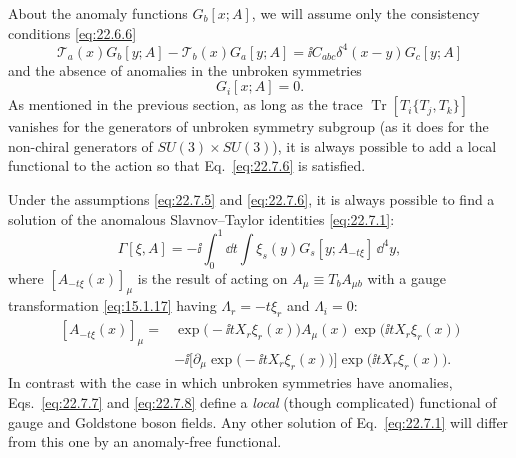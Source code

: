 About the anomaly functions $G_b[x;A]$, we will assume only the
consistency conditions \eqref{eq:22.6.6}
\begin{equation}
 \mathcal T_a(x)G_b[y;A]
 -\mathcal T_b(x)G_a[y;A]
 =\ii C_{abc}\delta^4(x-y)G_c[y;A]
 \tag{22.7.5}\label{eq:22.7.5}
\end{equation}
and the absence of anomalies in the unbroken symmetries
\begin{equation}
 G_i[x;A]=0.
 \tag{22.7.6}\label{eq:22.7.6}
\end{equation}
As mentioned in the previous section, as long as the trace
$\operatorname{Tr}[T_i\{T_j,T_k\}]$ vanishes for the generators of
unbroken symmetry subgroup (as it does for the non-chiral generators of
$SU(3)\times SU(3)$), it is always possible to add a local functional to
the action so that Eq.~\eqref{eq:22.7.6} is satisfied.

Under the assumptions \eqref{eq:22.7.5} and \eqref{eq:22.7.6}, it is
always possible to find a solution of the anomalous Slavnov--Taylor
identities \eqref{eq:22.7.1}:
\begin{equation}
 \Gamma[\xi,A]
 =-\ii\int_0^1\dd t\int \xi_s(y)G_s[y;A_{-t\xi}]\,\dd^4y,
 \tag{22.7.7}\label{eq:22.7.7}
\end{equation}
where $[A_{-t\xi}(x)]_\mu$ is the result of acting on
$A_\mu\equiv T_b A_{\mu b}$ with a gauge transformation
\eqref{eq:15.1.17} having $\Lambda_r=-t\xi_r$ and $\Lambda_i=0$:
\begin{equation}
 \begin{aligned}
 [A_{-t\xi}(x)]_\mu
 ={}&\exp\bigl(-\ii tX_r\xi_r(x)\bigr)A_\mu(x)
 \exp\bigl(\ii tX_r\xi_r(x)\bigr)
 \\
 &-\ii\bigl[\partial_\mu\exp\bigl(-\ii tX_r\xi_r(x)\bigr)\bigr]
 \exp\bigl(\ii tX_r\xi_r(x)\bigr).
 \end{aligned}
 \tag{22.7.8}\label{eq:22.7.8}
\end{equation}
In contrast with the case in which unbroken symmetries have anomalies,
Eqs.~\eqref{eq:22.7.7} and \eqref{eq:22.7.8} define a \emph{local}
(though complicated) functional of gauge and Goldstone boson fields.
Any other solution of Eq.~\eqref{eq:22.7.1} will differ from this one by
an anomaly-free functional.

